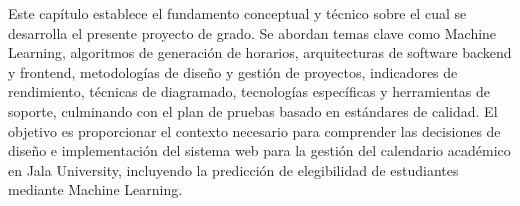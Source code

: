 Este capítulo establece el fundamento conceptual y técnico sobre el cual se desarrolla el presente proyecto de grado.
Se abordan temas clave como Machine Learning, algoritmos de generación de horarios, arquitecturas de software backend y frontend, metodologías de diseño y gestión de proyectos, indicadores de rendimiento, técnicas de diagramado, tecnologías específicas y herramientas de soporte, culminando con el plan de pruebas basado en estándares de calidad.
El objetivo es proporcionar el contexto necesario para comprender las decisiones de diseño e implementación del sistema web para la gestión del calendario académico en Jala University, incluyendo la predicción de elegibilidad de estudiantes mediante Machine Learning.
